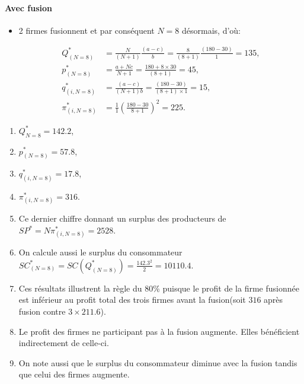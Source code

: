 \documentclass[notes, ignorenonframetext, compress, 10pt, xcolor=svgnames, aspectratio=169]{beamer}
\begin{document}
\begin{frame}[allowframebreaks]{\insertsection}
    \framesubtitle{Avec fusion}
    \begin{itemize}
        \item 2 firmes fusionnent et par conséquent $N=8$ désormais, d'où:
        
         \begin{align*}
        Q^*_{(N=8)} &= \frac{N}{(N+1)}\frac{(a-c)}{b} = \frac{8}{(8+1)}\frac{(180-30)}{1} = 135,\\
        p^*_{(N=8)} &= \frac{a+Nc}{N+1} = \frac{180+8\times 30}{(8+1)} = 45,\\
        q_{(i, N=8)}^*&=  \frac{(a-c)}{(N+1)b} = \frac{(180-30)}{(8+1)\times 1} =15   ,\\
        \pi_{(i, N=8)}^*&= \frac{1}{1}\left(\frac{180-30}{8+1}\right)^2 = 225.
        \end{align*}
    \end{itemize}
        \begin{enumerate}[$\star$]
            \item $Q^*_{N=8} = 142.2$, 
            \item $p^*_{(N=8)}=57.8$, 
            \item $q_{(i, N=8)}^* = 17.8$,  
            \item $\pi_{(i, N=8)}^*= 316$. 
            \item Ce dernier chiffre donnant un surplus des producteurs de 
            $SP^* = N\pi_{(i, N=8)}^*=2528$.
            \item On calcule aussi le surplus du consommateur  
            $SC_{(N=8)}^* = SC(Q_{(N=8)}^*) = \frac{142.3^2}{2} = 10110.4$.
            \framebreak
            \item Ces résultats illustrent la règle du 80\% puisque le profit de la firme fusionnée 
            est inférieur au profit total des trois firmes avant la fusion(soit $316$ 
            après fusion contre $3\times 211.6$). 
            \item Le profit des firmes ne participant pas à la fusion augmente. 
            Elles bénéficient indirectement de celle-ci.
            \item On note aussi que le surplus du consommateur diminue 
            avec la fusion tandis que celui des firmes augmente.
        \end{enumerate}
\end{frame}
\end{document}
